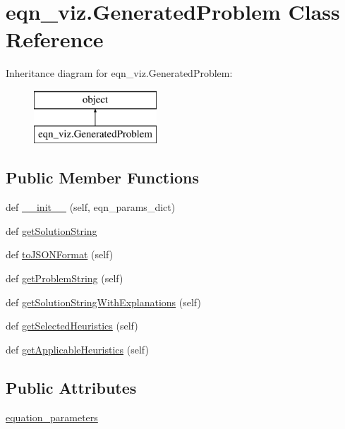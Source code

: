 \hypertarget{classeqn__viz_1_1_generated_problem}{}\section{eqn\+\_\+viz.\+Generated\+Problem Class Reference}
\label{classeqn__viz_1_1_generated_problem}
Inheritance diagram for eqn\+\_\+viz.\+Generated\+Problem\+:\begin{figure}[H]
\begin{center}
\leavevmode
\includegraphics[height=2.000000cm]{classeqn__viz_1_1_generated_problem}
\end{center}
\end{figure}
\subsection*{Public Member Functions}
\begin{DoxyCompactItemize}
\item 
def \hyperlink{classeqn__viz_1_1_generated_problem_ad04a6f39f4f93f4a13de81de58505fb4}{\+\_\+\+\_\+init\+\_\+\+\_\+} (self, eqn\+\_\+params\+\_\+dict)
\item 
def \hyperlink{classeqn__viz_1_1_generated_problem_ae247db4ad0774a3e18f1dea1d0978c3a}{get\+Solution\+String}
\item 
def \hyperlink{classeqn__viz_1_1_generated_problem_ab7cc30e0a4a74958cb900638f3f5d844}{to\+J\+S\+O\+N\+Format} (self)
\item 
def \hyperlink{classeqn__viz_1_1_generated_problem_a2a740b018ad78a52c13acde472570669}{get\+Problem\+String} (self)
\item 
def \hyperlink{classeqn__viz_1_1_generated_problem_a5d847ddc63b6e198aac1898b90f08e02}{get\+Solution\+String\+With\+Explanations} (self)
\item 
def \hyperlink{classeqn__viz_1_1_generated_problem_a9ab6f7cd7e238344c040cda33df75a53}{get\+Selected\+Heuristics} (self)
\item 
def \hyperlink{classeqn__viz_1_1_generated_problem_a982abb22d7aff44efea7f6fac6aa903d}{get\+Applicable\+Heuristics} (self)
\end{DoxyCompactItemize}
\subsection*{Public Attributes}
\begin{DoxyCompactItemize}
\item 
\hyperlink{classeqn__viz_1_1_generated_problem_a2e0f51cffcc4ffbaba5f48e7b537e93b}{equation\+\_\+parameters}
\end{DoxyCompactItemize}


